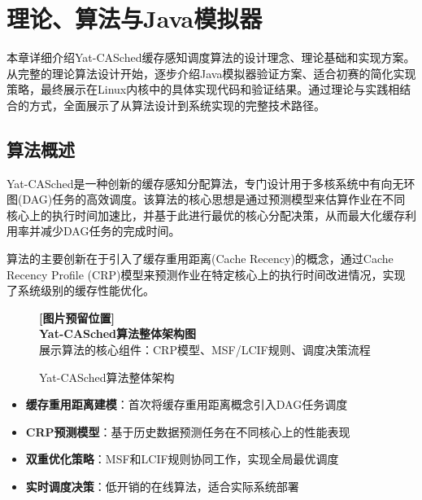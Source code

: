 
\section{理论、算法与Java模拟器} \label{sec:theory}

\begin{tcolorbox}[
    colback=blue!5!white,
    colframe=blue!50!black,
    title=\textbf{本章内容概述},
    fonttitle=\bfseries,
    arc=3pt
]
本章详细介绍Yat-CASched缓存感知调度算法的设计理念、理论基础和实现方案。从完整的理论算法设计开始，逐步介绍Java模拟器验证方案、适合初赛的简化实现策略，最终展示在Linux内核中的具体实现代码和验证结果。通过理论与实践相结合的方式，全面展示了从算法设计到系统实现的完整技术路径。
\end{tcolorbox}

\subsection{算法概述}

Yat-CASched是一种创新的缓存感知分配算法，专门设计用于多核系统中有向无环图(DAG)任务的高效调度。该算法的核心思想是通过预测模型来估算作业在不同核心上的执行时间加速比，并基于此进行最优的核心分配决策，从而最大化缓存利用率并减少DAG任务的完成时间。

算法的主要创新在于引入了缓存重用距离(Cache Recency)的概念，通过Cache Recency Profile (CRP)模型来预测作业在特定核心上的执行时间改进情况，实现了系统级别的缓存性能优化。

\begin{figure}[htbp]
\centering
\begin{tcolorbox}[
    colback=gray!10,
    colframe=gray!50,
    width=0.8\textwidth,
    center,
    arc=3pt
]
\centering
\textbf{[图片预留位置]}\\
\textbf{Yat-CASched算法整体架构图}\\
\footnotesize{展示算法的核心组件：CRP模型、MSF/LCIF规则、调度决策流程}
\end{tcolorbox}
\caption{Yat-CASched算法整体架构}
\label{fig:yat_overview}
\end{figure}

\begin{tcolorbox}[
    colback=blue!5!white,
    colframe=blue!50!black,
    title=\textbf{算法核心创新点},
    fonttitle=\bfseries,
    arc=3pt
]
\begin{itemize}
    \item \textbf{缓存重用距离建模}：首次将缓存重用距离概念引入DAG任务调度
    \item \textbf{CRP预测模型}：基于历史数据预测任务在不同核心上的性能表现
    \item \textbf{双重优化策略}：MSF和LCIF规则协同工作，实现全局最优调度
    \item \textbf{实时调度决策}：低开销的在线算法，适合实际系统部署
\end{itemize}
\end{tcolorbox}

